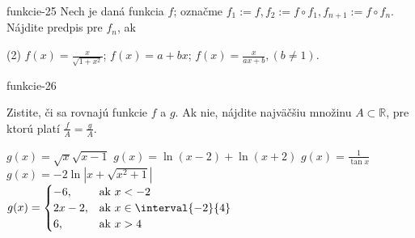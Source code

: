 \begin{defproblem}{funkcie-25}
Nech je daná funkcia $f$; označme $f_1:=f,f_2:=f\circ f_1,f_{n+1}:=f\circ f_n$. Nájdite predpis pre $f_n$, ak
\begin{tasks}(2)
  \task $f(x)=\frac{x}{\sqrt{1+x^2}}$;
  \task $f(x)=a+bx$;
  \task $f(x)=\frac{x}{ax+b},(b\neq 1)$.
\end{tasks}
\end{defproblem}

\begin{defproblem}{funkcie-26}
\begin{samepage}
Zistite, či sa rovnajú funkcie $f$ a $g$. Ak nie, nájdite najväčšiu množinu
$A\subset\mathbb{R}$, pre ktorú platí $\frac{f}{A}=\frac{g}{A}$.
\begin{tasks}
  \task
    $g(x) = \sqrt{x} \sqrt{x-1}$
  \task
    $g(x) = \ln{(x-2)} + \ln{(x+2)}$
  \task
    $g(x) = \frac{1}{\tan{x}}$
  \task
    $g(x) = -2 \ln{|x+\sqrt{x^2+1}|}$
  \task
    \\
    $g(x) =
      \begin{cases}
        -6,     & \text{ak } x < -2 \\
        2x - 2, & \text{ak } x \in \interval{-2}{4} \\
        6,      & \text{ak } x > 4
      \end{cases}
    $
\end{tasks}
\end{samepage}
\end{defproblem}

